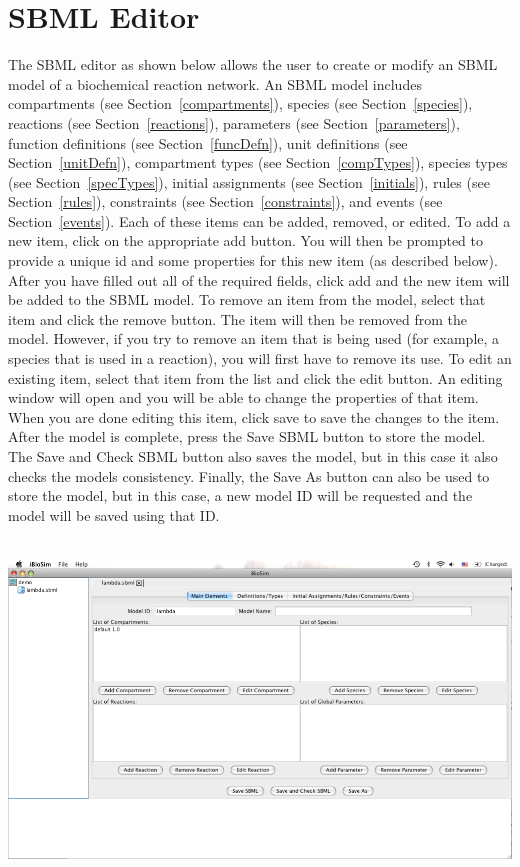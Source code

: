 \documentclass[titlepage,11pt]{article}
\begin{document}
\section{\label{SBMLEdit}SBML Editor}

\noindent
The SBML editor as shown below allows the user to create or modify an SBML
model of a biochemical reaction network.  An SBML model includes
compartments (see Section~\ref{compartments}), 
species (see Section~\ref{species}),
reactions (see Section~\ref{reactions}), 
parameters (see Section~\ref{parameters}),
function definitions (see Section~\ref{funcDefn}), 
unit definitions (see Section~\ref{unitDefn}), 
compartment types (see Section~\ref{compTypes}), 
species types (see Section~\ref{specTypes}),
initial assignments (see Section~\ref{initials}), 
rules (see Section~\ref{rules}), 
constraints (see Section~\ref{constraints}), and
events (see Section~\ref{events}).
Each of these items can be added, removed, or edited. 
To add a new item, click on the appropriate add button. You
will then be prompted to provide a unique id and some properties
for this new item (as described below). After you have filled out
all of the required fields, click add and the new item will be
added to the SBML model.
To remove an item from the model, select that item and click
the remove button. The item will then be removed from the model.
However, if you try to remove an item that is being used 
(for example, a species that is used in a reaction), you will first have 
to remove its use.
To edit an existing item, select that item from the list and
click the edit button. An editing window will open and you will
be able to change the properties of that item. When you are done
editing this item, click save to save the changes to the item. 
After the model is complete, press the Save SBML button to store
the model.  The Save and Check SBML button also saves the model, but
in this case it also checks the models consistency.
Finally, the Save As button can also be used to store the
model, but in this case, a new model ID will be requested and the
model will be saved using that ID. 
\begin{center}
\includegraphics[height=90mm]{screenshots/SBMLedit}
\end{center}
\end{document}
